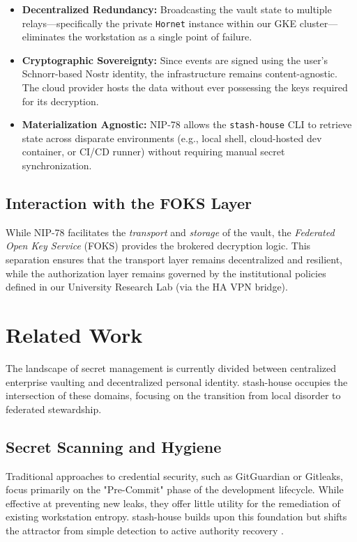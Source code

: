 \documentclass[11pt]{report}
\begin{document}
\begin{itemize}
	\item \textbf{Decentralized Redundancy:} Broadcasting the vault state to multiple relays---specifically the private \texttt{Hornet} instance within our GKE cluster---eliminates the workstation as a single point of failure.
	\item \textbf{Cryptographic Sovereignty:} Since events are signed using the user's Schnorr-based Nostr identity, the infrastructure remains content-agnostic. The cloud provider hosts the data without ever possessing the keys required for its decryption.
	\item \textbf{Materialization Agnostic:} NIP-78 allows the \texttt{stash-house} CLI to retrieve state across disparate environments (e.g., local shell, cloud-hosted dev container, or CI/CD runner) without requiring manual secret synchronization.
\end{itemize}

\subsection{Interaction with the FOKS Layer}
While NIP-78 facilitates the \textit{transport} and \textit{storage} of the vault, the \textit{Federated Open Key Service} (FOKS) provides the brokered decryption logic. This separation ensures that the transport layer remains decentralized and resilient, while the authorization layer remains governed by the institutional policies defined in our University Research Lab (via the HA VPN bridge).

\section{Related Work}
The landscape of secret management is currently divided between centralized enterprise vaulting and decentralized personal identity. stash-house occupies the intersection of these domains, focusing on the transition from local disorder to federated stewardship.

\subsection{Secret Scanning and Hygiene}
Traditional approaches to credential security, such as GitGuardian or Gitleaks, focus primarily on the "Pre-Commit" phase of the development lifecycle. While effective at preventing new leaks, they offer little utility for the remediation of existing workstation entropy. stash-house builds upon this foundation but shifts the attractor from simple detection to active authority recovery \cite{stashhouse}.
\end{document}
